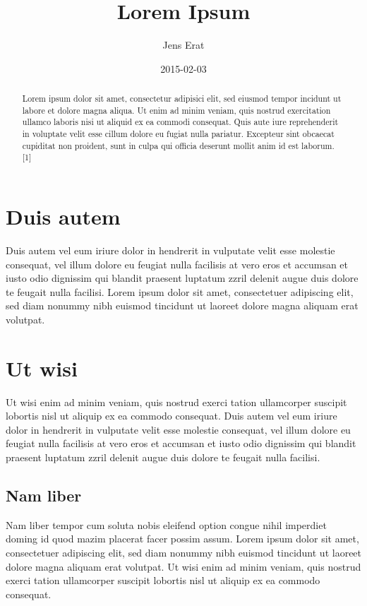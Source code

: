 \documentclass[12pt,twocolumn]{article}
\title{Lorem Ipsum\\\vspace{0.5em}{\large Opera sine nomine scripta}}
\author{Jens Erat}
\date{2015-02-03}
\begin{document}
\maketitle
\begin{abstract}
Lorem ipsum dolor sit amet, consectetur adipisici elit, sed eiusmod
tempor incidunt ut labore et dolore magna aliqua. Ut enim ad minim
veniam, quis nostrud exercitation ullamco laboris nisi ut aliquid ex ea
commodi consequat. Quis aute iure reprehenderit in voluptate velit esse
cillum dolore eu fugiat nulla pariatur. Excepteur sint obcaecat
cupiditat non proident, sunt in culpa qui officia deserunt mollit anim
id est laborum. {[}1{]}
\end{abstract}

\section{Duis autem}\label{duis-autem}

Duis autem vel eum iriure dolor in hendrerit in vulputate velit esse
molestie consequat, vel illum dolore eu feugiat nulla facilisis at vero
eros et accumsan et iusto odio dignissim qui blandit praesent luptatum
zzril delenit augue duis dolore te feugait nulla facilisi. Lorem ipsum
dolor sit amet, consectetuer adipiscing elit, sed diam nonummy nibh
euismod tincidunt ut laoreet dolore magna aliquam erat volutpat.

\section{Ut wisi}\label{ut-wisi}

Ut wisi enim ad minim veniam, quis nostrud exerci tation ullamcorper
suscipit lobortis nisl ut aliquip ex ea commodo consequat. Duis autem
vel eum iriure dolor in hendrerit in vulputate velit esse molestie
consequat, vel illum dolore eu feugiat nulla facilisis at vero eros et
accumsan et iusto odio dignissim qui blandit praesent luptatum zzril
delenit augue duis dolore te feugait nulla facilisi.

\subsection{Nam liber}\label{nam-liber}

Nam liber tempor cum soluta nobis eleifend option congue nihil imperdiet
doming id quod mazim placerat facer possim assum. Lorem ipsum dolor sit
amet, consectetuer adipiscing elit, sed diam nonummy nibh euismod
tincidunt ut laoreet dolore magna aliquam erat volutpat. Ut wisi enim ad
minim veniam, quis nostrud exerci tation ullamcorper suscipit lobortis
nisl ut aliquip ex ea commodo consequat.
\end{document}
